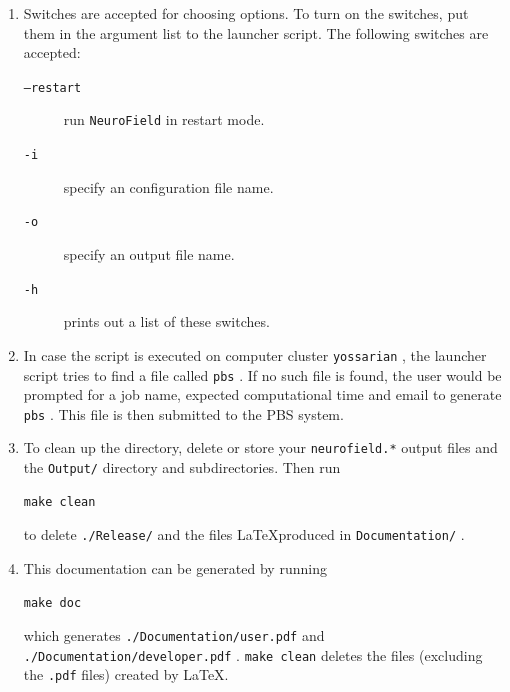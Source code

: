 \documentclass[12pt,a4paper]{article}
\newcommand{\type}[1]{ {\small\small\tt #1} }
\newcommand{\NF}[0]{ \type{NeuroField}}
\begin{document}
\begin{enumerate}
\item Switches are accepted for choosing options. To turn on the switches, put them in the argument list to the launcher script. The following switches are accepted:
	\begin{description}
	\item[\type{--restart}] run \NF in restart mode.
	\item[\type{-i}] specify an configuration file name.
	\item[\type{-o}] specify an output file name.
	\item[\type{-h}] prints out a list of these switches.
	\end{description}

\item In case the script is executed on computer cluster \type{yossarian}, the launcher script tries to find a file called \type{pbs}. If no such file is found, the user would be prompted for a job name, expected computational time and email to generate \type{pbs}. This file is then submitted to the PBS system.

\item To clean up the directory, delete or store your \type{neurofield.*} output files and the \type{Output/} directory and subdirectories. Then run
\begin{lstlisting}
make clean
\end{lstlisting}
to delete \type{./Release/} and the files \LaTeX produced in \type{Documentation/}.

\item This documentation can be generated by running 
\begin{lstlisting}
make doc
\end{lstlisting}
which generates \type{./Documentation/user.pdf} and \type{./Documentation/developer.pdf}. \type{make clean} deletes the files (excluding the \type{.pdf} files) created by \LaTeX.

\end{enumerate}


\end{document}
